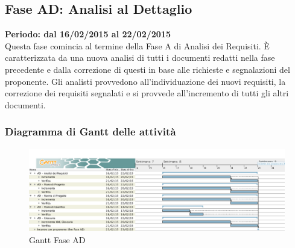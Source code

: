 \subsection{Fase AD: Analisi al Dettaglio}
\textbf{Periodo: dal 16/02/2015 al 22/02/2015}
\\
Questa fase comincia al termine della Fase A di Analisi dei Requisiti. È caratterizzata da una nuova analisi di tutti i documenti redatti nella fase precedente e dalla correzione di questi in base alle richieste e segnalazioni del proponente. Gli analisti provvedono all'individuazione dei nuovi requisiti, la correzione dei requisiti segnalati e si provvede all'incremento di tutti gli altri documenti.
\subsubsection{Diagramma di Gantt delle attività}
\begin{center}
	\begin{figure}\centering
		\includegraphics[width=\textwidth]{PianoDiProgetto/Pics/FaseAD.png}
		\caption{Gantt Fase AD}
	\end{figure}
\end{center}